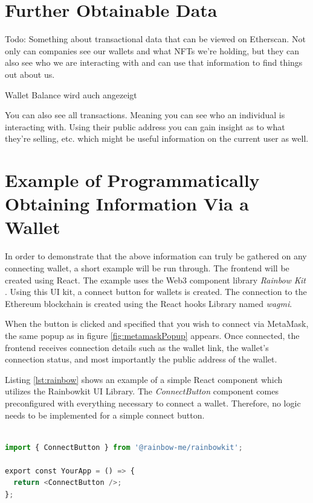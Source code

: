 %
%
\section{Further Obtainable Data}
\label{sec:methodology:moreData}

Todo: Something about transactional data that can be viewed on Etherscan. Not only can companies see our wallets and what NFTs we're holding, but they can also see who we are interacting with and can use that information to find things out about us.

Wallet Balance wird auch angezeigt

You can also see all transactions. Meaning you can see who an individual is interacting with. Using their public address you can gain insight as to what they're selling, etc. which might be useful information on the current user as well.

%
%
\section{Example of Programmatically Obtaining Information Via a Wallet}
\label{sec:methodology:code}
In order to demonstrate that the above information can truly be gathered on any connecting wallet, a short example will be run through. The frontend will be created using React. The example uses the Web3 component library \textit{Rainbow Kit} \cite{rainbowKit}. Using this UI kit, a connect button for wallets is created. The connection to the Ethereum blockchain is created using the React hooks Library named \textit{wagmi}.

When the button is clicked and specified that you wish to connect via MetaMask, the same popup as in figure \ref{fig:metamaskPopup} appears. Once connected, the frontend receives connection details such as the wallet link, the wallet's connection status, and most importantly the public address of the wallet.

Listing \ref{lst:rainbow} shows an example of a simple React component which utilizes the Rainbowkit UI Library. The \textit{ConnectButton} component comes preconfigured with everything necessary to connect a wallet. Therefore, no logic needs to be implemented for a simple connect button.

\begin{center}
\begin{lstlisting}[label=lst:rainbow ,language=python, caption=An example of implementing a connect wallet button within the frontend of a webapp using the \textit{RainbowKit} UI Library \cite{rainbowKit}., captionpos=b]

import { ConnectButton } from '@rainbow-me/rainbowkit';

export const YourApp = () => {
  return <ConnectButton />;
};

\end{lstlisting}
\end{center}

